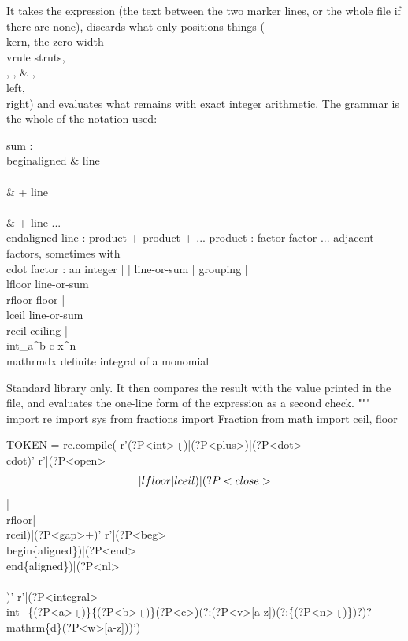 It takes the expression (the text between the two marker lines, or the whole file if
there are none), discards what only positions things (\\kern, the zero-width \\vrule
struts, \\, , & , \\left, \\right) and
evaluates what remains with exact integer arithmetic. The grammar is the whole
of the notation used:

    sum      :  \\begin{aligned} & line  \\\\ & + line  \\\\ & + line ...  \\end{aligned}
    line     :  product + product + ...
    product  :  factor factor ...            adjacent factors, sometimes with \\cdot
    factor   :  an integer
             |  [ line-or-sum ]                grouping
             |  \\lfloor line-or-sum \\rfloor    floor
             |  \\lceil  line-or-sum \\rceil     ceiling
             |  \\int_{a}^{b} c x^{n} \\mathrm{d}x     definite integral of a monomial

Standard library only. It then compares the result with the value printed in
the file, and evaluates the one-line form of the expression as a second check.
"""
import re
import sys
from fractions import Fraction
from math import ceil, floor

TOKEN = re.compile(
    r'(?P<int>\d+)|(?P<plus>\+)|(?P<dot>\\cdot)'
    r'|(?P<open>\[|\\lfloor|\\lceil)|(?P<close>\]|\\rfloor|\\rceil)|(?P<gap>\s+)'
    r'|(?P<beg>\\begin\{aligned\})|(?P<end>\\end\{aligned\})|(?P<nl>\\\\)'
    r'|(?P<integral>\\int_\{(?P<a>\d+)\}\^\{(?P<b>\d+)\}\s*(?P<c>\d*)(?:(?P<v>[a-z])(?:\^\{(?P<n>\d+)\})?)?\s*\\mathrm\{d\}(?P<w>[a-z]))')


